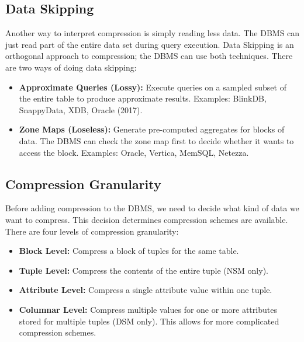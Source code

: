 \documentclass[11pt]{article}
\begin{document}
\subsection*{Data Skipping}
Another way to interpret compression is simply reading less data. The DBMS can just read part of the entire data set during query execution. Data Skipping is an orthogonal approach to compression; the DBMS can use both techniques. There are two ways of doing data skipping:
\begin{itemize}
    \item \textbf{Approximate Queries (Lossy):} Execute queries on a sampled subset of the entire table to produce approximate results. Examples: BlinkDB, SnappyData, XDB, Oracle (2017).
    \item \textbf{Zone Maps (Loseless):} Generate pre-computed aggregates for blocks of data. The DBMS can check the zone map first to decide whether it wants to access the block. Examples: Oracle, Vertica, MemSQL, Netezza.
\end{itemize}

\subsection*{Compression Granularity}
Before adding compression to the DBMS, we need to decide what kind of data we want to compress. This decision determines compression schemes are available. There are four levels of compression granularity:
\begin{itemize}
    \item \textbf{Block Level:}
    Compress a block of tuples for the same table.
    
    \item \textbf{Tuple Level:}
    Compress the contents of the entire tuple (NSM only).
    
    \item \textbf{Attribute Level:}
    Compress a single attribute value within one tuple.
    
    \item \textbf{Columnar Level:}
    Compress multiple values for one or more attributes stored for multiple tuples (DSM only). This allows for more complicated compression schemes.
\end{itemize}
\end{document}
